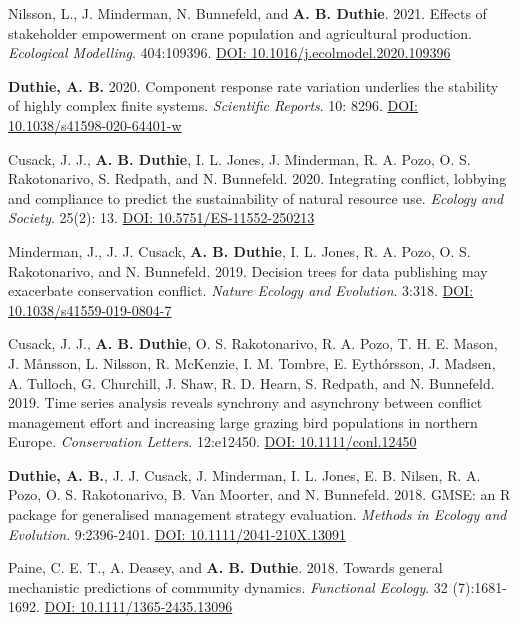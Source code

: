\documentclass[letterpaper]{article}
\begin{document}
\begin{etaremune}
\item Nilsson, L., J. Minderman, N. Bunnefeld, and {\bf A. B. Duthie}. 2021. Effects of stakeholder empowerment on crane population and agricultural production. {\it Ecological Modelling}. 404:109396. \href{https://doi.org/10.1016/j.ecolmodel.2020.109396}{DOI: 10.1016/j.ecolmodel.2020.109396}
\item {\bf Duthie, A. B.} 2020. Component response rate variation underlies the stability of highly complex finite systems. {\it Scientific Reports}. 10: 8296. \href{https://www.nature.com/articles/s41598-020-64401-w}{DOI: 10.1038/s41598-020-64401-w}
\item Cusack, J. J., {\bf A. B. Duthie}, I. L. Jones, J. Minderman, R. A. Pozo, O. S. Rakotonarivo, S. Redpath, and N. Bunnefeld. 2020. Integrating conflict, lobbying and compliance to predict the sustainability of natural resource use. {\it Ecology and Society}. 25(2): 13. \href{https://doi.org/10.5751/ES-11552-250213}{DOI: 10.5751/ES-11552-250213}
\item Minderman, J., J. J. Cusack, {\bf A. B. Duthie}, I. L. Jones, R. A. Pozo, O. S. Rakotonarivo, and N. Bunnefeld. 2019. Decision trees for data publishing may exacerbate conservation conflict. {\it Nature Ecology and Evolution}. 3:318. \href{https://doi.org/10.1038/s41559-019-0804-7}{DOI: 10.1038/s41559-019-0804-7}
\item Cusack, J. J., {\bf A. B. Duthie}, O. S. Rakotonarivo, R. A. Pozo, T. H. E. Mason, J. M\r{a}nsson, L. Nilsson, R. McKenzie, I. M. Tombre, E. Eyth\'{o}rsson, J. Madsen, A. Tulloch, G. Churchill, J. Shaw, R. D. Hearn, S. Redpath, and N. Bunnefeld. 2019. Time series analysis reveals synchrony and asynchrony between conflict management effort and increasing large grazing bird populations in northern Europe. {\it Conservation Letters}. 12:e12450. \href{http://onlinelibrary.wiley.com/doi/10.1111/conl.12450/full}{DOI: 10.1111/conl.12450}
\item {\bf Duthie, A. B.}, J. J. Cusack, J. Minderman, I. L. Jones, E. B. Nilsen, R. A. Pozo, O. S. Rakotonarivo, B. Van Moorter, and N. Bunnefeld. 2018. GMSE: an R package for generalised management strategy evaluation. {\it Methods in Ecology and Evolution}. 9:2396-2401. \href{https://besjournals.onlinelibrary.wiley.com/doi/10.1111/2041-210X.13091}{DOI: 10.1111/2041-210X.13091} 
\item Paine, C. E. T., A. Deasey, and {\bf A. B. Duthie}. 2018. Towards general mechanistic predictions of community dynamics. {\it Functional Ecology}. 32 (7):1681-1692. \href{http://onlinelibrary.wiley.com/doi/10.1111/1365-2435.13096/pdf}{DOI: 10.1111/1365-2435.13096}

\end{etaremune}
\end{document}
